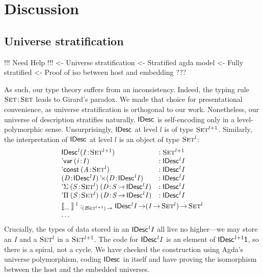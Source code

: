 \section{Discussion}
\label{sec:discussion}

\subsection{Universe stratification}

\begin{wstructure}
!!! Need Help !!!
<- Universe stratification
    <- Stratified agda model
        <- Fully stratified
        <- Proof of iso between host and embedding
    ???
\end{wstructure}

As such, our type theory suffers from an inconsistency. Indeed, the
typing rule $\Bhab{\Set}{\Set}$ leads to Girard's paradox. We made
that choice for presentational convenience, as universe stratification
is orthogonal to our work. Nonetheless, our universe of description
stratifies naturally. $\IDesc{\!}$ is self-encoding only in a
level-polymorphic sense.  Unsurprisingly, $\IDesc{\!}$ at level $l$ is
of type $\Set^{\blue{l+1}}$. Similarly, the interpretation of
$\IDesc{\!}$ at level $l$ is an object of type $\Set^{\blue{l}}$:
%
\[\stk{\begin{array}{@{}ll}
\IDesc{\!}^{\blue{l}} (\Bhab{\M{I}}{\Set^{\blue{l+1}}}) & :\Set^{\blue{l+1}} \\
\DVar{(\Bhab{\M{i}}{\M{I}})} &: \IDesc{\!}^{\blue{l}}{\M{I}} \\
\DConst{(\Bhab{\M{A}}{\Set^{\blue{l}}})} &:\IDesc{\!}^{\blue{l}}{\M{I}}       \\
\DProd{(\Bhab{\M{D}}{\IDesc{\!}^{\blue{l}}{\M{I}}})}{(\Bhab{\M{D}}{\IDesc{\!}^{\blue{l}}{\M{I}}})}
  & :\IDesc{\!}^{\blue{l}}{\M{I}}       \\
\DSigma{(\Bhab{\M{S}}{\Set^{\blue{l}}})}{(\Bhab{\M{D}}{\M{S}\To\IDesc{\!}^{\blue{l}}{\M{I}}})}
& : \IDesc{\!}^{\blue{l}}{\M{I}}  \\
\DPi{(\Bhab{\M{S}}{\Set^{\blue{l}}})}{(\Bhab{\M{D}}{\M{S}\To\IDesc{\!}^{\blue{l}}{\M{I}}})}
& : \IDesc{\!}^{\blue{l}}{\M{I}}  \\
\end{array}\smallskip \\
\idescop{\_\:}{}{}^{\blue{l}} : _{\PI{\V{I}}{\Set^{\blue{l+1}}}} \IDesc{{\!}^{\blue{l}}\V{I}} \To (\V{I} \To \Set^{\blue{l}}) \To \Set^{\blue{l}}    \\
\ldots
}
\]
Crucially, the types of data stored in an
\(\IDesc{\!}^{\blue{l}}{\M{I}}\) all live no higher---we may store an
\(I\) and a \(\Set^{\blue{l}}\) in a \(\Set^{\blue{l+1}}\).  The code
for \(\IDesc{\!}^{\blue{l}}{\M{I}}\) is an element of
\(\IDesc{\!}^{\blue{l+1}}{\Unit}\), so there is a spiral, not a cycle.
We have checked the construction using Agda's universe polymorphism,
coding $\IDesc{\!}$ in itself and have proving the isomorphism
between the host and the embedded universes.

